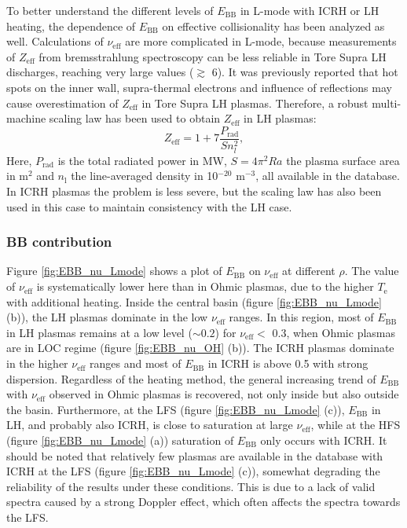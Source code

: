 To better understand the different levels of $E_\mathrm{BB}$ in L-mode with ICRH or LH heating, the dependence of $E_\mathrm{BB}$ on effective collisionality has been analyzed as well. Calculations of $\nu_\mathrm{eff}$ are more complicated in L-mode, because measurements of $Z_\mathrm{eff}$ from bremsstrahlung spectroscopy can be less reliable in Tore Supra LH discharges, reaching very large values ($\gtrsim$ 6). It was previously reported that hot spots on the inner wall, supra-thermal electrons and influence of reflections may cause overestimation of $Z_\mathrm{eff}$ in Tore Supra LH plasmas. \cite{Schunke_2005_RSI} Therefore, a robust multi-machine scaling law \cite{Matthews_1997_JNM} has been used to obtain $Z_\mathrm{eff}$ in LH plasmas:%
\begin{equation}\label{eq:Zeff}
  Z_\mathrm{eff} = 1 + 7\frac{P_\mathrm{rad}}{S n_l^2},
\end{equation}
\noindent Here, $P_\mathrm{rad}$ is the total radiated power in MW, $S=4\pi^2Ra$ the plasma surface area in m$^2$ and $n_\mathrm{l}$ the line-averaged density in 10$^{-20}$ m$^{-3}$, all available in the database. In ICRH plasmas the problem is less severe, but the scaling law has also been used in this case to maintain consistency with the LH case.


\subsubsection{BB contribution}

Figure \ref{fig:EBB_nu_Lmode} shows a plot of $E_\mathrm{BB}$ on $\nu_\mathrm{eff}$ at different $\rho$. The value of $\nu_\mathrm{eff}$ is systematically lower here than in Ohmic plasmas, due to the higher $T_\mathrm{e}$ with additional heating. Inside the central basin (figure \ref{fig:EBB_nu_Lmode} (b)), the LH plasmas dominate in the low $\nu_\mathrm{eff}$ ranges. In this region, most of $E_\mathrm{BB}$ in LH plasmas remains at a low level ($\sim 0.2$) for $\nu_\mathrm{eff} < $ 0.3, when Ohmic plasmas are in LOC regime (figure \ref{fig:EBB_nu_OH} (b)). The ICRH plasmas dominate in the higher $\nu_\mathrm{eff}$ ranges and most of $E_\mathrm{BB}$ in ICRH is above 0.5 with strong dispersion. Regardless of the heating method, the general increasing trend of $E_\mathrm{BB}$ with $\nu_\mathrm{eff}$ observed in Ohmic plasmas is recovered, not only inside but also outside the basin. Furthermore, at the LFS (figure \ref{fig:EBB_nu_Lmode} (c)), $E_\mathrm{BB}$ in LH, and probably also ICRH, is close to saturation at large $\nu_\mathrm{eff}$, while at the HFS (figure \ref{fig:EBB_nu_Lmode} (a)) saturation of $E_\mathrm{BB}$ only occurs with ICRH. It should be noted that relatively few plasmas are available in the database with ICRH at the LFS (figure \ref{fig:EBB_nu_Lmode} (c)), somewhat degrading the reliability of the results under these conditions. This is due to a lack of valid spectra caused by a strong Doppler effect, which often affects the spectra towards the LFS.


